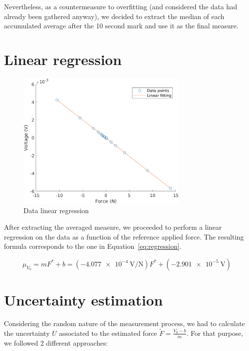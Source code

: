 \documentclass[12pt]{article}
\begin{document}
        Nevertheless, as a countermeasure to overfitting (and considered the data had already been gathered anyway), we decided to extract the median of each accumulated average after the 10 second mark and use it as the final measure.

\section{Linear regression} \label{sec:lin_regression}

        \begin{figure}[!ht]
                \includegraphics[width=0.75\textwidth]{Fitting.png}
                \centering
                \caption{Data linear regression}
                \label{fig:regression}
        \end{figure}

        After extracting the averaged measure, we proceeded to perform a linear regression on the data as a function of the reference applied force. The resulting formula corresponds to the one in Equation~\ref{eq:regression}.

        \begin{equation} \label{eq:regression}
                \mu_{V_0} = m F^{*} + b = (\SI{-4.077e-4}{\volt\per\newton}) F^{*} + (\SI{-2.901e-5}{\volt})
        \end{equation}

\section{Uncertainty estimation} \label{sec:uncertainty}

        Considering the random nature of the measurement process, we had to calculate the uncertainty \( U \) associated to the estimated force \( \widetilde{F} = \frac{V_0 - b}{m} \). For that purpose, we followed 2 different approaches:
\end{document}

